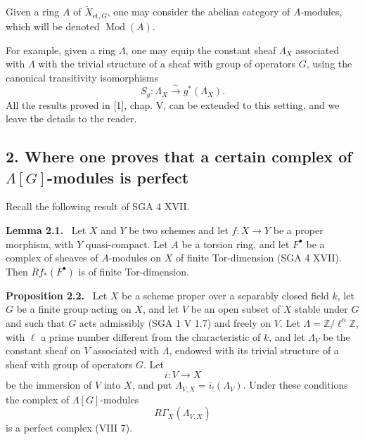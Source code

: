 \documentclass[11pt]{article}
\newenvironment{statement}[1]{\par\medskip\noindent\textbf{#1.}\ }{\par\medskip}
\providecommand{\et}{\mathrm{\acute{e}t}}
\providecommand{\Mod}{\operatorname{Mod}}
\begin{document}
Given a ring $A$ of $\widetilde X_{\et,G}$, one may consider the abelian category of $A$-modules, which will be denoted $\Mod(A)$.

For example, given a ring $\Lambda$, one may equip the constant sheaf $\Lambda_X$ associated with $\Lambda$ with the trivial structure of a sheaf with group of operators $G$, using the canonical transitivity isomorphisms
\[
S_g:\Lambda_X\xrightarrow{\sim}g^*(\Lambda_X).
\]
All the results proved in [1], chap. V, can be extended to this setting, and we leave the details to the reader.

\subsection*{2. Where one proves that a certain complex of $\Lambda[G]$-modules is perfect}

Recall the following result of SGA 4 XVII.

\begin{statement}{Lemma 2.1}
Let $X$ and $Y$ be two schemes and let $f:X\to Y$ be a proper morphism, with $Y$ quasi-compact. Let $A$ be a torsion ring, and let $F^\bullet$ be a complex of sheaves of $A$-modules on $X$ of finite Tor-dimension (SGA 4 XVII). Then $Rf_*(F^\bullet)$ is of finite Tor-dimension.
\end{statement}

\begin{statement}{Proposition 2.2}
Let $X$ be a scheme proper over a separably closed field $k$, let $G$ be a finite group acting on $X$, and let $V$ be an open subset of $X$ stable under $G$ and such that $G$ acts admissibly (SGA 1 V 1.7) and freely on $V$. Let $\Lambda=\mathbb Z/\ell^n\mathbb Z$, with $\ell$ a prime number different from the characteristic of $k$, and let $\Lambda_V$ be the constant sheaf on $V$ associated with $\Lambda$, endowed with its trivial structure of a sheaf with group of operators $G$. Let
\[
i:V\longrightarrow X
\]
be the immersion of $V$ into $X$, and put $\Lambda_{V,X}=i_!(\Lambda_V)$. Under these conditions the complex of $\Lambda[G]$-modules
\[
R\Gamma_X(\Lambda_{V,X})
\]
is a perfect complex (VIII 7).
\end{statement}
\end{document}
